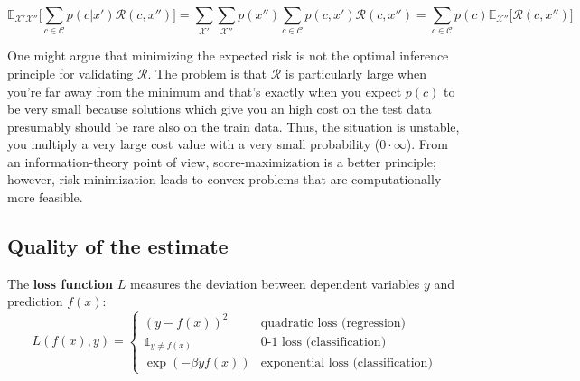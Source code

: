 \documentclass[twoside]{article}
\begin{document}
$$\mathbb{E}_{\mathcal{X}' \mathcal{X}''}\Big[ \sum_{c \in \mathcal{C}} p(c|x')\mathcal{R}(c,x'') \Big] = \sum_{\mathcal{X}'}\sum_{\mathcal{X}''} p(x'') \sum_{c \in \mathcal{C}} p(c,x')\mathcal{R}(c,x'')= \sum_{c \in \mathcal{C}} p(c) \mathbb{E}_{\mathcal{X}''}\big[ \mathcal{R}(c,x'') \big]$$

One might argue that minimizing the expected risk is not the optimal inference principle for validating $\mathcal{R}$. The problem is that $\mathcal{R}$ is particularly large when you're far away from the minimum and that's exactly when you expect $p(c)$ to be very small because solutions which give you an high cost on the test data presumably should be rare also on the train data. Thus, the situation is  unstable, you multiply a very large cost value with a very small probability ($0 \cdot \infty$). From an information-theory point of view, score-maximization is a better principle; however, risk-minimization leads to convex problems that are computationally more feasible.

\subsection{Quality of the estimate}

The \textbf{loss function} $L$ measures the deviation between dependent variables $y$ and  prediction $f(x)$:
\begin{equation*}
  L(f(x),y) =
    \begin{cases}
      (y - f(x))^2 & \text{quadratic loss (regression)}\\
      \mathds{1}_{y \neq f(x)} & \text{0-1 loss (classification)}\\
      \exp{(-\beta y f(x))} & \text{exponential loss (classification)}
    \end{cases}       
\end{equation*}
\end{document}
